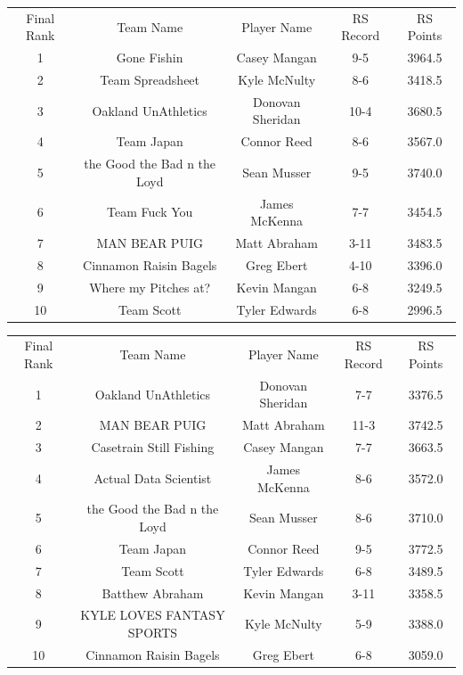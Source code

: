 \documentclass[11pt,letterpaper]{article}
\begin{document}
\newpage
{}
\vspace{-25pt}
\begin{table} [h]
\begin{center}
\begin{tabular} { c c c c c }
\\ Final Rank & Team Name & Player Name & RS Record & RS Points
\\ 1  & Gone Fishin  & Casey Mangan & 9-5  & 3964.5
\\ 2  & Team Spreadsheet  & Kyle McNulty & 8-6  & 3418.5
\\ 3  & Oakland UnAthletics  & Donovan Sheridan & 10-4  & 3680.5
\\ 4  & Team Japan  & Connor Reed & 8-6  & 3567.0
\\ 5  & the Good the Bad n the Loyd  & Sean Musser & 9-5  & 3740.0
\\ 6  & Team Fuck You  & James McKenna & 7-7  & 3454.5
\\ 7  & MAN BEAR PUIG  & Matt Abraham & 3-11  & 3483.5
\\ 8  & Cinnamon Raisin Bagels  & Greg Ebert & 4-10  & 3396.0
\\ 9  & Where my Pitches at?  & Kevin Mangan & 6-8  & 3249.5
\\ 10  & Team Scott  & Tyler Edwards & 6-8  & 2996.5
\end{tabular}
\end{center}
\end{table}

\vspace{-25pt}
\begin{table} [h]
\begin{center}
\begin{tabular} { c c c c c }
\\ Final Rank & Team Name & Player Name & RS Record & RS Points
\\ 1  & Oakland UnAthletics  & Donovan Sheridan & 7-7  & 3376.5
\\ 2  & MAN BEAR PUIG  & Matt Abraham & 11-3 & 3742.5
\\ 3  & Casetrain Still Fishing & Casey Mangan & 7-7 & 3663.5
\\ 4  & Actual Data Scientist & James McKenna & 8-6 & 3572.0
\\ 5  & the Good the Bad n the Loyd  & Sean Musser & 8-6  & 3710.0
\\ 6  & Team Japan & Connor Reed & 9-5 & 3772.5
\\ 7  & Team Scott & Tyler Edwards & 6-8 & 3489.5
\\ 8  & Batthew Abraham & Kevin Mangan & 3-11 & 3358.5
\\ 9  & KYLE LOVES FANTASY SPORTS & Kyle McNulty & 5-9 & 3388.0
\\ 10  & Cinnamon Raisin Bagels & Greg Ebert & 6-8 & 3059.0
\end{tabular}
\end{center}
\end{table}
\end{document}

